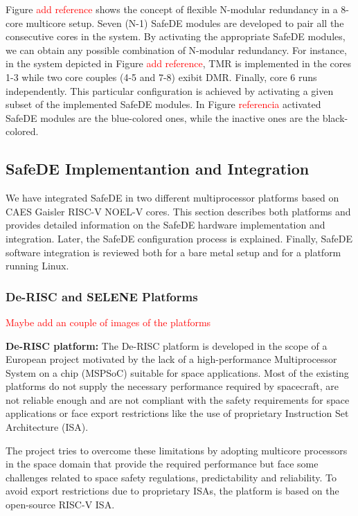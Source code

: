 Figure \textcolor{red}{add reference} shows the concept of flexible N-modular redundancy in a 8-core multicore setup. Seven (N-1) SafeDE modules are developed to pair all the consecutive cores in the system. By activating the appropriate SafeDE modules, we can obtain any possible combination of N-modular redundancy. For instance, in the system depicted in Figure \textcolor{red}{add reference}, TMR is implemented in the cores 1-3 while two core couples (4-5 and 7-8) exibit DMR. Finally, core 6 runs independently. This particular configuration is achieved by activating a given subset of the implemented SafeDE modules. In Figure \textcolor{red}{referencia} activated SafeDE modules are the blue-colored ones, while the inactive ones are the black-colored.

\bigskip



\subsection{SafeDE Implementantion and Integration}

We have integrated SafeDE in two different multiprocessor platforms based on CAES Gaisler RISC-V NOEL-V cores. This section describes both platforms and provides detailed information on the SafeDE hardware implementation and integration. Later, the SafeDE configuration process is explained. Finally, SafeDE software integration is reviewed both for a bare metal setup and for a platform running Linux.    

\bigskip


\subsubsection{De-RISC and SELENE Platforms}
\textcolor{red}{Maybe add an couple of images of the platforms}


\textbf{De-RISC platform:} The De-RISC platform \cite{gomez2020risc} is developed in the scope of a European project motivated by the lack of a high-performance Multiprocessor System on a chip (MSPSoC) suitable for space applications. Most of the existing platforms do not supply the necessary performance required by spacecraft, are not reliable enough and are not compliant with the safety requirements for space applications or face export restrictions like the use of proprietary Instruction Set Architecture (ISA). 

The project tries to overcome these limitations by adopting multicore processors in the space domain that provide the required performance but face some challenges related to space safety regulations, predictability and reliability. To avoid export restrictions due to proprietary ISAs, the platform is based on the open-source RISC-V ISA. 

